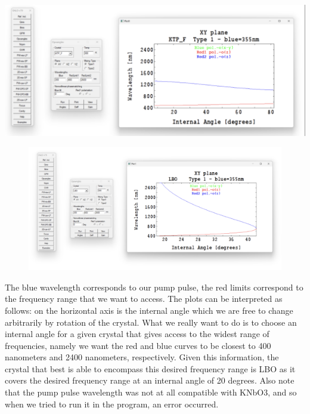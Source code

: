 \documentclass[12pt]{article}
\begin{document}
\includegraphics[width=\textwidth]{4.png}
\begin{figure}
\includegraphics[width=\textwidth]{5.png}
\end{figure}

The blue wavelength corresponds to our pump pulse, the red limits correspond to the frequency range that we want to access. The plots can be interpreted as follows: on the horizontal axis is the internal angle which we are free to change arbitrarily by rotation of the crystal. What we really want to do is to choose an internal angle for a given crystal that gives access to the widest range of frequencies, namely we want the red and blue curves to be closest to 400 nanometers and 2400 nanometers, respectively. Given this information, the crystal that best is able to encompass this desired frequency range is LBO as it covers the desired frequency range at an internal angle of 20 degrees. Also note that the pump pulse wavelength was not at all compatible with KNbO3, and so when we tried to run it in the program, an error occurred.
\end{document}
